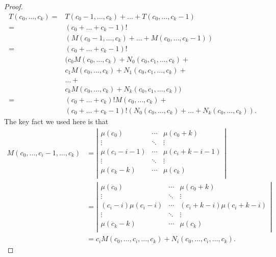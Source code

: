 \documentclass[12pt]{amsart}
\newcommand{\ifact}{\mu}
\newcommand{\M}{M}
\newcommand{\N}{N}
\begin{document}
\begin{proof}
\begin{align*}
T(c_0, \dots, c_k) = & T(c_0-1, \dots, c_k) + \dots + T(c_0, \dots, c_k-1) \\
= & (c_0 + \dots + c_k-1)! \\
& ( \M(c_0-1, \dots, c_k) + \dots + \M(c_0, \dots, c_k-1)) \\
= & (c_0 + \dots + c_k-1)! \\
& ( c_0 \M(c_0, \dots, c_k) + \N_0(c_0, c_1, \dots, c_k) + \\
& c_1 \M(c_0, \dots, c_k) + \N_1(c_0, c_1, \dots, c_k) + \\
& \dots + \\
& c_k \M(c_0, \dots, c_k) + \N_k(c_0, c_1, \dots, c_k) ) \\
= & (c_0 + \dots + c_k)! \M(c_0,\dots,c_k) + \\
& (c_0+\dots+c_k-1)! (\N_0(c_0,\dots,c_k) + \dots + \N_k(c_0,\dots,c_k)).
\end{align*}
The key fact we used here is that
\begin{align*}
\M(c_0, \dots, c_i - 1, \dots, c_k) & = \left|
\begin{matrix}
\ifact(c_0) & \cdots & \ifact(c_0+k) \\
\vdots & \ddots & \vdots \\
\ifact(c_i-i-1) & \cdots & \ifact(c_i+k-i-1) \\
\vdots & \ddots & \vdots \\
\ifact(c_k-k) & \cdots & \ifact(c_k) \\
\end{matrix} \right| \\
& = \left|
\begin{matrix}
\ifact(c_0) & \cdots & \ifact(c_0+k) \\
\vdots & \ddots & \vdots \\
(c_i - i) \ifact(c_i-i) & \cdots & (c_i+k-i) \ifact(c_i+k-i) \\
\vdots & \ddots & \vdots \\
\ifact(c_k-k) & \cdots & \ifact(c_k) \\
\end{matrix} \right| \\
& = c_i \M(c_0, \dots, c_i, \dots, c_k) + \N_i(c_0, \dots, c_i, \dots, c_k).
\end{align*}


\end{proof}
\end{document}
